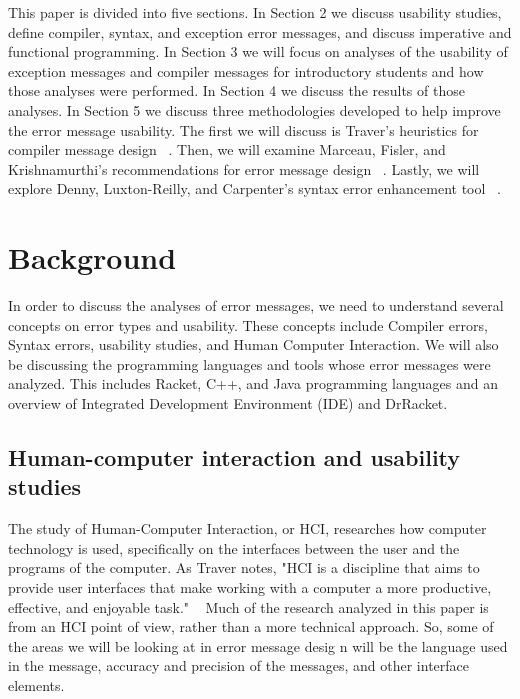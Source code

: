 \documentclass{sig-alternate}
\begin{document}
This paper is divided into five sections. In Section 2 we discuss usability studies, define compiler, syntax, and exception error messages, and discuss imperative and functional programming. In Section 3 we will focus on  analyses of the usability of exception messages and compiler messages for introductory students and how those analyses were performed. In Section 4 we discuss the results of those analyses. In Section 5 we discuss three methodologies developed to help improve the error message usability. The first we will discuss is Traver's heuristics for compiler message design ~\cite{Traver:2010}. Then, we will examine Marceau, Fisler, and Krishnamurthi's recommendations for error message design ~\cite{Marceau:2011:MYL:2048237.2048241}. Lastly, we will explore Denny, Luxton-Reilly, and Carpenter's syntax error enhancement tool ~\cite{Denny:2014:ESE:2591708.2591748}.



\section{Background}\label{background}
In order to discuss the analyses of error messages, we need to understand several concepts on error types and usability. These concepts include Compiler errors, Syntax errors, usability studies, and Human Computer Interaction. We will also be discussing the programming languages and tools whose error messages were analyzed. This includes Racket, C++, and Java programming languages and an overview of Integrated Development Environment (IDE) and DrRacket. 


\subsection{Human-computer interaction and usability studies}

The study of Human-Computer Interaction, or HCI, researches how computer technology is used, specifically on the interfaces between the user and the programs of the computer. As Traver notes, "HCI is a discipline that aims to provide user interfaces that make working with a computer a more productive, effective, and enjoyable task." ~\cite{Traver:2010} Much of the research analyzed in this paper is from an HCI point of view, rather than a more technical approach. So, some of the areas we will be looking at in error message desig n will be the language used in the message, accuracy and precision of the messages, and other interface elements. 
\end{document}
